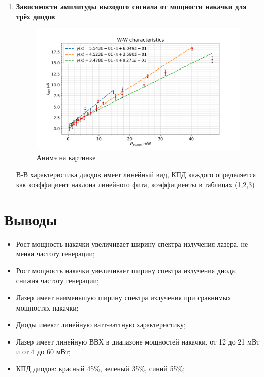 \documentclass[a4paper]{article}
\begin{document}
\begin{enumerate}
            
            \item \textbf{Зависимости амплитуды выходого сигнала от мощности накачки для трёх диодов} \par
            
                \begin{figure}[H]
                    \begin{center}
                        \includegraphics[scale=0.5]{W-W-led.png}
                        \caption{Анимэ на картинке}
                        \label{W-W-led}
                    \end{center}
                \end{figure}
                
                \par В-В характеристика диодов имеет линейный вид, КПД каждого определяется как коэффициент наклона линейного фита, коэффициенты в таблицах (1,2,3)
                
                
                
                
        
        \end{enumerate}
    
\section{Выводы}

    \begin{itemize}
        \item Рост мощность накачки увеличивает ширину спектра излучения лазера, не меняя частоту генерации;
        \item Рост мощность накачки увеличивает ширину спектра излучения диода, снижая частоту генерации;
        \item Лазер имеет наименьшую ширину спектра излучения при сравнимых мощностях накачки;
        \item Диоды имеют линейную ватт-ваттную характеристику;
        \item Лазер имеет линейную ВВХ в диапазоне мощностей накачки, от 12 до 21 мВт и от 4 до 60 мВт;
        \item КПД диодов: красный 45\%, зеленый 35\%, синий 55\%;
    \end{itemize}
\end{document}
